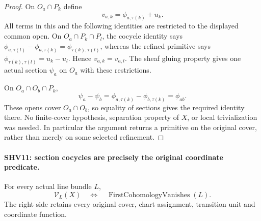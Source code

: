 \documentclass[11pt,a4paper]{article}
\numberwithin{equation}{section}
\theoremstyle{remark}\newtheorem{remark}[theorem]{Remark}
\begin{document}
\begin{proof}
On $O_a\cap P_k$ define
\[
                   v_{a,k}=\phi_{a,\tau(k)}+u_k.
                                                        \tag{SHV.18}
\]
All terms in this and the following identities are restricted
to the displayed common open.  On
$O_a\cap P_k\cap P_l$, the cocycle identity says
$\phi_{a,\tau(l)}-\phi_{a,\tau(k)}
 =\phi_{\tau(k),\tau(l)}$, whereas the refined primitive
says $\phi_{\tau(k),\tau(l)}=u_k-u_l$.
Hence $v_{a,k}=v_{a,l}$.  The sheaf gluing property gives
one actual section $\psi_a$ on $O_a$ with these restrictions.

On $O_a\cap O_b\cap P_k$,
\[
 \psi_a-\psi_b
   =\phi_{a,\tau(k)}-\phi_{b,\tau(k)}
   =\phi_{ab}.
\]
These opens cover $O_a\cap O_b$, so equality of sections gives
the required identity there.  No finite-cover hypothesis,
separation property of $X$, or local trivialization was needed.
In particular the argument returns a primitive on the original
cover, rather than merely on some selected refinement.
\end{proof}

\paragraph{SHV11: section cocycles are precisely the original coordinate predicate.}
\label{claim:SHV11}
For every actual line bundle $L$,
\[
 \mathcal V_L(X)
       \quad\Longleftrightarrow\quad
             \operatorname{FirstCohomologyVanishes}(L).
                                                        \tag{SHV.19}
\]
The right side retains every original cover, chart assignment,
transition unit and coordinate function.
\end{document}
